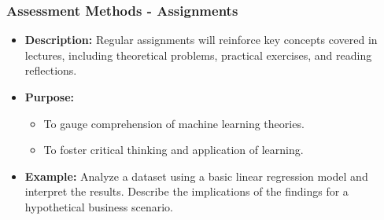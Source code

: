 \documentclass[aspectratio=169]{beamer}
\begin{document}
\begin{frame}[fragile]
    \frametitle{Assessment Methods - Assignments}
    \begin{itemize}
        \item \textbf{Description:} Regular assignments will reinforce key concepts covered in lectures, including theoretical problems, practical exercises, and reading reflections.
        \item \textbf{Purpose:}
        \begin{itemize}
            \item To gauge comprehension of machine learning theories.
            \item To foster critical thinking and application of learning.
        \end{itemize}
        \item \textbf{Example:} Analyze a dataset using a basic linear regression model and interpret the results. Describe the implications of the findings for a hypothetical business scenario.
    \end{itemize}
\end{frame}
\end{document}
